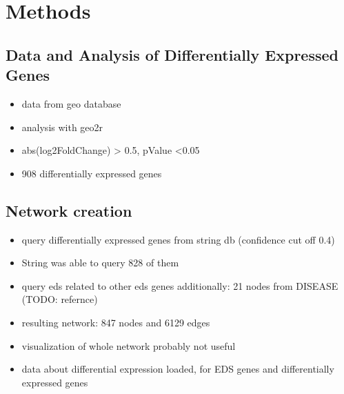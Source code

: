 \section{Methods}

\subsection{Data and Analysis of Differentially Expressed Genes}
\begin{itemize}
	\item data from geo database
	\item analysis with geo2r
	\item abs(log2FoldChange) > 0.5, pValue <0.05
	\item 908 differentially expressed genes
\end{itemize}

\subsection{Network creation}
\begin{itemize}
	\item query differentially expressed genes from string db (confidence cut off 0.4)
	\item String was able to query 828 of them
	\item query eds related to other eds genes additionally: 21 nodes from DISEASE (TODO: refernce)
	\item resulting network: 847 nodes and 6129 edges
	\item visualization of whole network probably not useful
	\item data about differential expression loaded, for EDS genes and differentially expressed genes
\end{itemize}